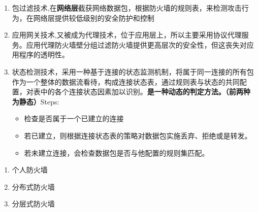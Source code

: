 \begin{enumerate}
	\item 包过滤技术,在\textbf{网络层}截获网络数据包，根据防火墙的规则表，来检测攻击行为，在网络层提供较低级别的安全防护和控制
	\item 应用网关技术,又被成为代理技术，位于应用层上，所以主要采用协议代理服务。应用代理防火墙壁分组过滤防火墙提供更高层次的安全性，但这丧失对应用程序的透明性。
	\item 状态检测技术，采用一种基于连接的状态监测机制，将属于同一连接的所有包作为一个整体的数据流看待，构成连接状态表，通过规则表与状态的共同配置，对表中的各个连接状态因素加以识别。\textbf{是一种动态的判定方法。（前两种为静态）}Steps:
	\begin{itemize}
		\item 检查是否属于一个已建立的连接
		\item 若已建立，则根据连接状态表的策略对数据包实施丢弃、拒绝或是转发。
		\item 若未建立连接，会检查数据包是否与他配置的规则集匹配。
	\end{itemize}
\end{enumerate}

\begin{enumerate}
	\item 个人防火墙
	\item 分布式防火墙
	\item 分层式防火墙
\end{enumerate}

